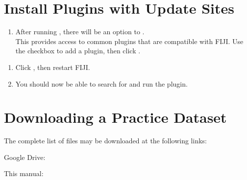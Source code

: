 \documentclass[letterpaper,10pt,english]{jupyterBook}
\begin{document}
\section{Install Plugins with Update Sites}
\label{\detokenize{installation:install-plugins-with-update-sites}}\begin{enumerate}
%
\item {} 
\sphinxAtStartPar
After running , there will be an option to .\\
This provides access to common plugins that are compatible with FIJI. Use the checkbox to add a plugin, then click .

\end{enumerate}

\sphinxAtStartPar
{}
\begin{enumerate}
%
\setcounter{enumi}{1}
\item {} 
\sphinxAtStartPar
Click , then restart FIJI.

\item {} 
\sphinxAtStartPar
You should now be able to search for and run the plugin.

\end{enumerate}


\section{Downloading a Practice Dataset}
\label{\detokenize{installation:downloading-a-practice-dataset}}
\sphinxAtStartPar
The complete list of files may be downloaded at the following links:

\sphinxAtStartPar
Google Drive:

\sphinxAtStartPar
This manual: 
\end{document}
